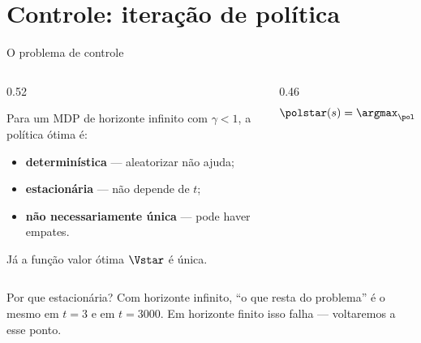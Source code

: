 \documentclass[aspectratio=169, 11pt]{beamer}
\begin{document}
\section{Controle: iteração de política}

\begin{frame}{O problema de controle}
  \begin{columns}[T]
    \begin{column}{0.52\textwidth}
      {\small Para um MDP de horizonte infinito com $\gamma<1$, a política ótima é:
      \begin{itemize}\setlength{\itemsep}{0.2ex}
        \item \textbf{determinística} --- aleatorizar não ajuda;
        \item \textbf{estacionária} --- não depende de $t$;
        \item \textbf{não necessariamente única} --- pode haver empates.
      \end{itemize}
      \smallskip
      Já a \alert{função valor ótima} $\Vstar$ é única.}
    \end{column}
    \begin{column}{0.46\textwidth}
  \vspace{+1.9em}
  \[
    \polstar(s) = \argmax_{\pol} \Vpi(s)
  \]
  \vspace{-1.2em}
    \end{column}
  \end{columns}
  \vspace{-0.2em}
  \begin{ideiabox}
    Por que estacionária? Com horizonte infinito, ``o que resta do problema'' é o mesmo em
    $t=3$ e em $t=3000$. Em horizonte finito isso falha --- voltaremos a esse ponto.
  \end{ideiabox}
\end{frame}
\end{document}

